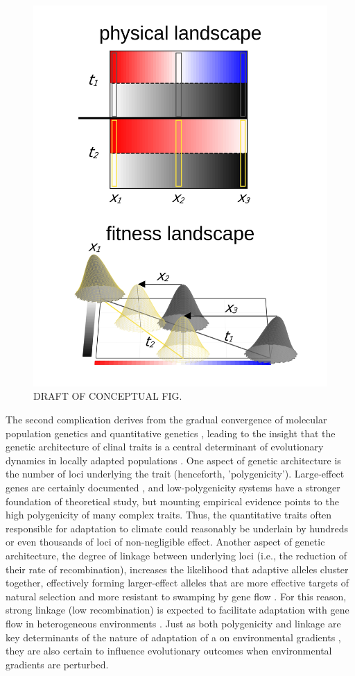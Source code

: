 \documentclass[9pt,twocolumn,twoside,lineno]{pnas-new}
\begin{document}
\begin{figure}%
\centering
\includegraphics[width=.8\linewidth]{conceptual_fig/ch2_conceptual_fig}
\caption{DRAFT OF CONCEPTUAL FIG.}
\label{tab:conceptual}
\end{figure}



The second complication derives from the gradual convergence of molecular population genetics
and quantitative genetics \cite{barghi_polygenic,barton,pritchard_human_adaptation,pritchard_sweeps_alone},
leading to the insight that the genetic architecture of
clinal traits is a central determinant
of evolutionary dynamics in locally adapted populations \cite{yeaman_review}. 
One aspect of genetic architecture is the number of loci 
underlying the trait (henceforth, 'polygenicity'). 
Large-effect genes are certainly documented \cite{martin,rees},
and low-polygenicity systems have a stronger foundation
of theoretical study,
but mounting empirical evidence points to the high polygenicity 
of many complex traits\cite{boyle,rockman,savolainen,sella,barghi_polygenic}.
Thus, the quantitative traits often responsible for adaptation to climate could reasonably be 
underlain by hundreds or even thousands of loci of non-negligible effect.
Another aspect of genetic architecture, the degree of linkage between underlying loci
(i.e., the reduction of their rate of recombination),
increases the likelihood that adaptive alleles cluster together,
effectively forming larger-effect alleles that are more 
effective targets of natural selection and more resistant
to swamping by gene flow \cite{yeaman_whitlock}.
For this reason, strong linkage (low recombination)
is expected to facilitate
adaptation with gene flow in heterogeneous environments \cite{tigano}.
Just as both polygenicity and linkage
are key determinants of the nature of adaptation of a 
on environmental gradients \cite{barton,yeaman_whitlock,yeaman_review},
they are also certain to influence evolutionary
outcomes when environmental gradients are perturbed.
\end{document}
